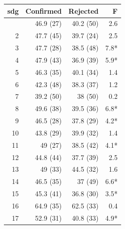\begin{table}[t]
\fontsize{12.0pt}{14.4pt}\selectfont
\begin{tabular*}{\linewidth}{@{\extracolsep{\fill}}rrrr}
\toprule
sdg & Confirmed & Rejected & F \\ 
\midrule\addlinespace[2.5pt]
1 & 46.9 (27) & 40.2 (50) & 2.6 \\ 
2 & 47.7 (45) & 39.7 (24) & 2.5 \\ 
3 & 47.7 (28) & 38.5 (48) & 7.8* \\ 
4 & 47.9 (43) & 36.9 (39) & 5.9* \\ 
5 & 46.3 (35) & 40.1 (34) & 1.4 \\ 
6 & 42.3 (48) & 38.3 (37) & 1.2 \\ 
7 & 39.2 (50) & 38 (50) & 0.2 \\ 
8 & 49.6 (38) & 39.5 (36) & 6.8* \\ 
9 & 46.5 (28) & 37.8 (29) & 4.2* \\ 
10 & 43.8 (29) & 39.9 (32) & 1.4 \\ 
11 & 49 (27) & 38.5 (42) & 4.1* \\ 
12 & 44.8 (44) & 37.7 (39) & 2.5 \\ 
13 & 49 (33) & 44.5 (32) & 1.6 \\ 
14 & 46.5 (35) & 37 (49) & 6.6* \\ 
15 & 45.3 (41) & 36.8 (30) & 3.5* \\ 
16 & 64.9 (35) & 62.5 (33) & 0.4 \\ 
17 & 52.9 (31) & 40.8 (33) & 4.9* \\ 
\bottomrule
\end{tabular*}
\end{table}

